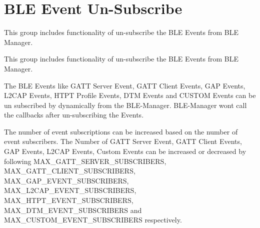 \hypertarget{group__ble__manager__event__unsubscribe}{}\section{B\+LE Event Un-\/\+Subscribe}
\label{group__ble__manager__event__unsubscribe}


This group includes functionality of un-\/subscribe the B\+LE Events from B\+LE Manager.  


This group includes functionality of un-\/subscribe the B\+LE Events from B\+LE Manager. 

The B\+LE Events like G\+A\+TT Server Event, G\+A\+TT Client Events, G\+AP Events, L2\+C\+AP Events, H\+T\+PT Profile Events, D\+TM Events and C\+U\+S\+T\+OM Events can be un subscribed by dynamically from the B\+L\+E-\/\+Manager. B\+L\+E-\/\+Manager won\textquotesingle{}t call the callbacks after un-\/subscribing the Events.

The number of event subscriptions can be increased based on the number of event subscribers. The Number of G\+A\+TT Server Event, G\+A\+TT Client Events, G\+AP Events, L2\+C\+AP Events, Custom Events can be increased or decreased by following M\+A\+X\+\_\+\+G\+A\+T\+T\+\_\+\+S\+E\+R\+V\+E\+R\+\_\+\+S\+U\+B\+S\+C\+R\+I\+B\+E\+RS, M\+A\+X\+\_\+\+G\+A\+T\+T\+\_\+\+C\+L\+I\+E\+N\+T\+\_\+\+S\+U\+B\+S\+C\+R\+I\+B\+E\+RS, M\+A\+X\+\_\+\+G\+A\+P\+\_\+\+E\+V\+E\+N\+T\+\_\+\+S\+U\+B\+S\+C\+R\+I\+B\+E\+RS, M\+A\+X\+\_\+\+L2\+C\+A\+P\+\_\+\+E\+V\+E\+N\+T\+\_\+\+S\+U\+B\+S\+C\+R\+I\+B\+E\+RS, M\+A\+X\+\_\+\+H\+T\+P\+T\+\_\+\+E\+V\+E\+N\+T\+\_\+\+S\+U\+B\+S\+C\+R\+I\+B\+E\+RS, M\+A\+X\+\_\+\+D\+T\+M\+\_\+\+E\+V\+E\+N\+T\+\_\+\+S\+U\+B\+S\+C\+R\+I\+B\+E\+RS and M\+A\+X\+\_\+\+C\+U\+S\+T\+O\+M\+\_\+\+E\+V\+E\+N\+T\+\_\+\+S\+U\+B\+S\+C\+R\+I\+B\+E\+RS respectively.